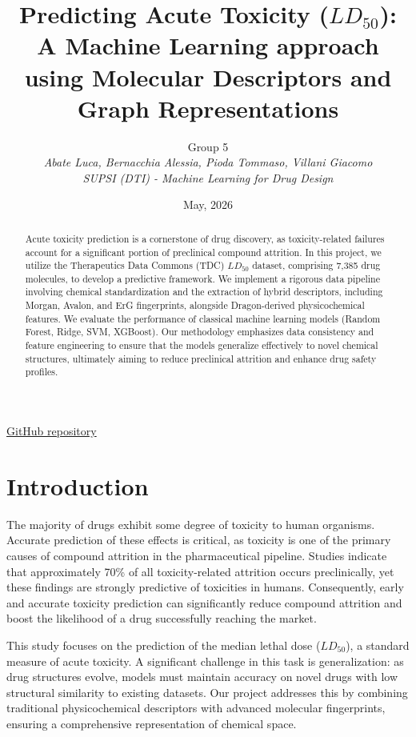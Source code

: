 \documentclass[10pt,a4paper,twocolumn]{article}
\title{Predicting Acute Toxicity ($LD_{50}$): A Machine Learning approach using Molecular Descriptors and Graph Representations}
\author{Group 5 \\ 
        \small \textit{Abate Luca, Bernacchia Alessia, Pioda Tommaso, Villani Giacomo} \\
        \small \textit{SUPSI (DTI) - Machine Learning for Drug Design}}
\date{May, 2026}
\begin{document}
\maketitle

\href{https://github.com/LucaBTE/toxicity-prediction}{GitHub repository}

\begin{abstract}
Acute toxicity prediction is a cornerstone of drug discovery, as
toxicity-related failures account for a significant portion of preclinical
compound attrition. In this project, we utilize the Therapeutics Data Commons
(TDC) $LD_{50}$ dataset, comprising 7,385 drug molecules, to develop a
predictive framework. We implement a rigorous data pipeline involving chemical
standardization and the extraction of hybrid descriptors, including Morgan,
Avalon, and ErG fingerprints, alongside Dragon-derived physicochemical features.
We evaluate the performance of classical machine learning models (Random Forest,
Ridge, SVM, XGBoost). Our methodology
emphasizes data consistency and feature engineering to ensure that the models
generalize effectively to novel chemical structures, ultimately aiming to reduce
preclinical attrition and enhance drug safety profiles.
\end{abstract}

\section{Introduction}

The majority of drugs exhibit some degree of toxicity to human organisms.
Accurate prediction of these effects is critical, as toxicity is one of the
primary causes of compound attrition in the pharmaceutical pipeline. Studies
indicate that approximately 70\% of all toxicity-related attrition occurs
preclinically, yet these findings are strongly predictive of toxicities in
humans. Consequently, early and accurate toxicity prediction can significantly
reduce compound attrition and boost the likelihood of a drug successfully
reaching the market.

This study focuses on the prediction of the median lethal dose ($LD_{50}$), a
standard measure of acute toxicity. A significant challenge in this task is
generalization: as drug structures evolve, models must maintain accuracy on
novel drugs with low structural similarity to existing datasets. Our project
addresses this by combining traditional physicochemical descriptors with
advanced molecular fingerprints, ensuring a
comprehensive representation of chemical space.
\end{document}
